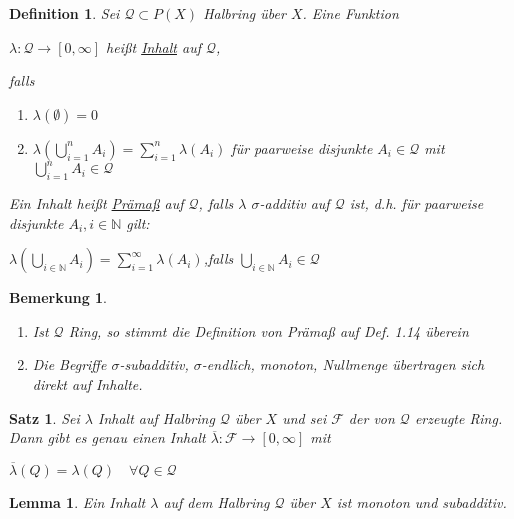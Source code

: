 \documentclass[11pt]{memoir}
\theoremstyle{changebreak}
\newtheorem{Definition}{Definition}[chapter]
\newtheorem{Bemerkung}{Bemerkung}[chapter]
\newtheorem{Lemma}{Lemma}[chapter]
\newtheorem{Satz}{Satz}[chapter]
\begin{document}
\begin{Definition}
Sei $\mathscr Q \subset P(X)$ Halbring über $X$. Eine Funktion 
\begin{center}
	$\lambda: \mathscr Q \rightarrow [0, \infty ]$ heißt \underline{Inhalt} auf $\mathscr Q$, 
\end{center}	
falls
\begin{enumerate}
	\item $\lambda(\emptyset) = 0$
	\item $\lambda\left(\bigcup\limits_{i=1}^n	A_i\right) = \sum\limits_{i=1}^n \lambda(A_i)$ für paarweise disjunkte $A_i \in \mathscr Q$ mit $\bigcup\limits_{i=1}^n A_i \in \mathscr Q$
\end{enumerate}

Ein Inhalt heißt \underline{Prämaß} auf $\mathscr Q$, falls $\lambda$ $\sigma$-additiv auf $\mathscr Q$ ist, d.h. für paarweise disjunkte $A_i, i \in \mathbb N$ gilt: 
\begin{center}
	$\lambda\left(\bigcup\limits_{i\in \mathbb N} A_i \right) = \sum\limits_{i=1}^\infty \lambda(A_i)$,\quad  falls $\bigcup\limits_{i \in \mathbb N} A_i \in \mathscr Q$
\end{center}	
\end{Definition}

\begin{Bemerkung}
\begin{enumerate}
	\item Ist $\mathscr Q$ Ring, so stimmt die Definition von Prämaß auf \emph{Def. 1.14} überein
	\item Die Begriffe $\sigma$-subadditiv, $\sigma$-endlich, monoton, Nullmenge übertragen sich direkt auf Inhalte.
\end{enumerate}
\end{Bemerkung}

\begin{Satz}
Sei $\lambda$ Inhalt auf Halbring $\mathscr Q$ über $X$ und sei $\mathscr F$ der von $\mathscr Q$ erzeugte Ring. Dann gibt es genau einen Inhalt $\overline{\lambda}: \mathscr F \rightarrow [0, \infty]$ mit 
\begin{center}
	$\overline{\lambda}(Q) = \lambda(Q)\quad \forall Q \in \mathscr Q$
\end{center}
\end{Satz}


\begin{Lemma}
Ein Inhalt $\lambda$ auf dem Halbring $\mathscr Q$ über $X$ ist monoton und subadditiv.
\end{Lemma}
\end{document}

